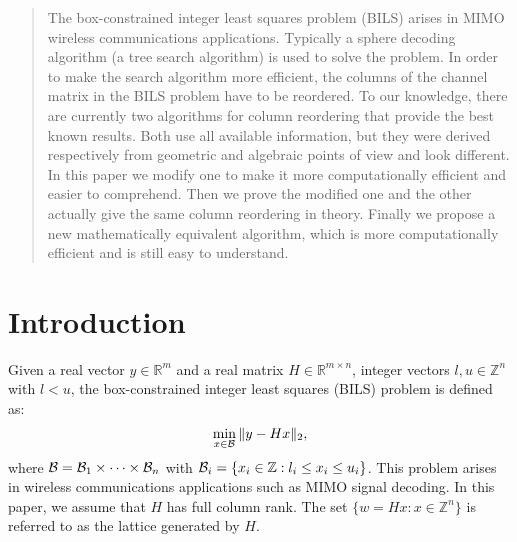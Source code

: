 \documentclass[conference]{IEEEtran}
\newcommand{\be}{\begin{equation}}
\newcommand{\ee}{\end{equation}}
\begin{document}
\begin{abstract}
The box-constrained integer least squares problem (BILS) arises in MIMO wireless
communications applications. Typically a sphere decoding algorithm (a tree search algorithm)
is used to solve the problem. In order to make the search algorithm
 more efficient, the columns of the channel matrix in the BILS problem have to
be reordered.  
To our knowledge, there are currently two algorithms for column reordering that provide the best known results. 
Both use all available information, but they were derived respectively from geometric and algebraic points of view
and look different. 
In this paper we modify one to make it more computationally efficient and easier to comprehend.
Then we prove the modified one and the other actually give the same column reordering in theory.
Finally we propose a new mathematically equivalent algorithm, which is more computationally efficient
and is still easy to understand.
\end{abstract}





%
\IEEEpeerreviewmaketitle



\section{Introduction}
Given a real vector $y\in\mathbb{R}^m$ and a real matrix $H\in\mathbb{R}^{m \times n}$, 
integer vectors $l, u \in \mathbb{Z}^n$ with $l<u$,
the box-constrained integer least squares (BILS)
problem is defined as:
\be\label{eq:bils0}
\min_{x\in {\cal B }}  \| y- Hx \|_2,  
\ee
where ${\cal B} = {\cal B}_1  \times \cdots \times {\cal B}_n$ with
${\cal B}_i = \{x_i \in\mathbb{Z} : l_i \le x_i \le u_i \}$.
This problem arises in wireless communications applications such as MIMO signal decoding. 
In this paper, we assume that $H$ has full column rank.
The set $\{w=Hx : x\in \mathbb{Z}^n\}$ is referred to as the lattice
generated by $H$.
\end{document}
